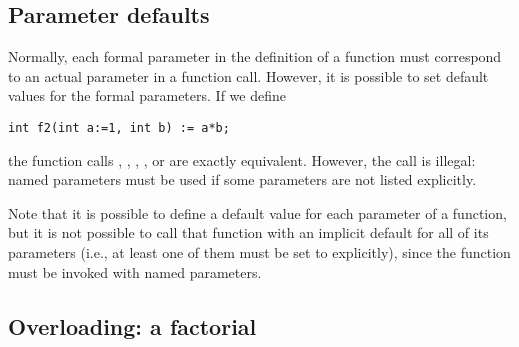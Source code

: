 \subsection{Parameter defaults}

Normally, each formal parameter in the definition of a function must
correspond to an actual parameter in a function call.
However, it is possible to set default values for the formal parameters.
If we define
\begin{lstlisting}
int f2(int a:=1, int b) := a*b;
\end{lstlisting}
the function calls , ,
, , or  are
exactly equivalent.
However, the call  is illegal: named
parameters must be used if some parameters are not listed explicitly.

Note that it is possible to define a default value for each parameter
of a function, but it is not possible to call that function with an
implicit default for all of its parameters
(i.e., at least one of them must be set to  explicitly),
since the function must be invoked with named parameters.


\subsection{Overloading: a  factorial} \label{SEC:realFactorial}

